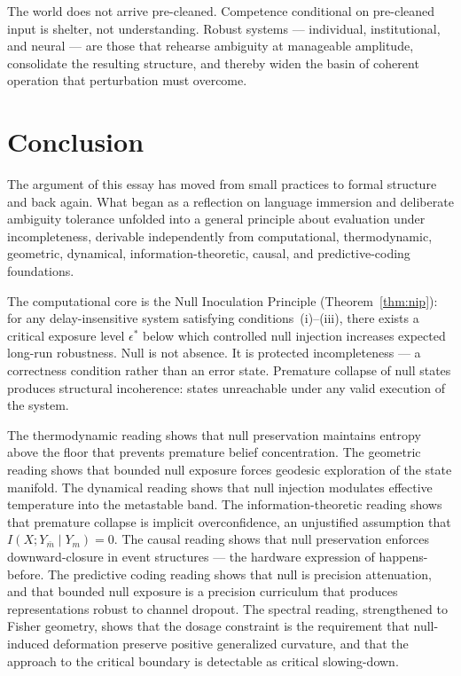 \documentclass[11pt]{article}
\theoremstyle{remark}
\begin{document}
The world does not arrive pre-cleaned. Competence conditional on pre-cleaned input is shelter, not understanding. Robust systems --- individual, institutional, and neural --- are those that rehearse ambiguity at manageable amplitude, consolidate the resulting structure, and thereby widen the basin of coherent operation that perturbation must overcome.

\section{Conclusion}

The argument of this essay has moved from small practices to formal structure and back again. What began as a reflection on language immersion and deliberate ambiguity tolerance unfolded into a general principle about evaluation under incompleteness, derivable independently from computational, thermodynamic, geometric, dynamical, information-theoretic, causal, and predictive-coding foundations.

The computational core is the Null Inoculation Principle (Theorem~\ref{thm:nip}): for any delay-insensitive system satisfying conditions~(i)--(iii), there exists a critical exposure level $\epsilon^*$ below which controlled null injection increases expected long-run robustness. Null is not absence. It is protected incompleteness --- a correctness condition rather than an error state. Premature collapse of null states produces structural incoherence: states unreachable under any valid execution of the system.

The thermodynamic reading shows that null preservation maintains entropy above the floor that prevents premature belief concentration. The geometric reading shows that bounded null exposure forces geodesic exploration of the state manifold. The dynamical reading shows that null injection modulates effective temperature into the metastable band. The information-theoretic reading shows that premature collapse is implicit overconfidence, an unjustified assumption that $I(X; Y_{\bar m} \mid Y_m) = 0$. The causal reading shows that null preservation enforces downward-closure in event structures --- the hardware expression of happens-before. The predictive coding reading shows that null is precision attenuation, and that bounded null exposure is a precision curriculum that produces representations robust to channel dropout. The spectral reading, strengthened to Fisher geometry, shows that the dosage constraint is the requirement that null-induced deformation preserve positive generalized curvature, and that the approach to the critical boundary is detectable as critical slowing-down.
\end{document}
